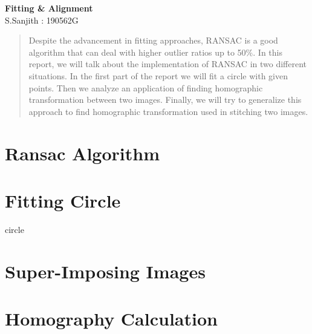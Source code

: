 \documentclass{article}
\begin{document}
\begin{center} 
    {\Large \textbf{Fitting \& Alignment}}\\\vspace*{.1cm}
    S.Sanjith : 190562G
\end{center}
\vspace*{-.2cm}
\HRule
\begin{abstract}
    Despite the advancement in fitting approaches, RANSAC  is a good algorithm that can deal with higher outlier ratios up to 50\%.    In this report, we will talk about the implementation of RANSAC in two different situations. In the first part of the report we will fit a circle with given points. Then we analyze an application of finding homographic transformation between two images. Finally, we will try to generalize this approach to find homographic transformation used in stitching two images.
\end{abstract}
\section{Ransac Algorithm}
\section{Fitting Circle}
{circle}
\section{Super-Imposing Images}
\section{Homography Calculation}
\end{document}
